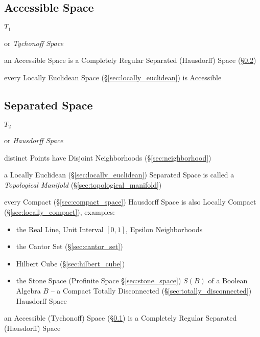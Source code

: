 \subsection{Accessible Space}\label{sec:accessible_space}

$\xspace{T}_1$

or \emph{Tychonoff Space}

an Accessible Space is a Completely Regular Separated (Hausdorff) Space
(\S\ref{sec:separated_space})

every Locally Euclidean Space (\S\ref{sec:locally_euclidean}) is Accessible



\subsection{Separated Space}\label{sec:separated_space}

$\xspace{T}_2$

or \emph{Hausdorff Space}

distinct Points have Disjoint Neighborhoods (\S\ref{sec:neighborhood})

a Locally Euclidean (\S\ref{sec:locally_euclidean}) Separated Space is called a
\emph{Topological Manifold} (\S\ref{sec:topological_manifold})

every Compact (\S\ref{sec:compact_space}) Hausdorff Space is also Locally
Compact (\S\ref{sec:locally_compact}), examples:
\begin{itemize}
  \item the Real Line, Unit Interval $[0,1]$, Epsilon Neighborhoods
  \item the Cantor Set (\S\ref{sec:cantor_set})
  \item Hilbert Cube (\S\ref{sec:hilbert_cube})
  \item the Stone Space (Profinite Space \S\ref{sec:stone_space})
    $\xspace{S}(B)$ of a Boolean Algebra $B$ -- a Compact Totally Disconnected
    (\S\ref{sec:totally_disconnected}) Hausdorff Space
\end{itemize}

an Accessible (Tychonoff) Space (\S\ref{sec:accessible_space}) is a Completely
Regular Separated (Hausdorff) Space



